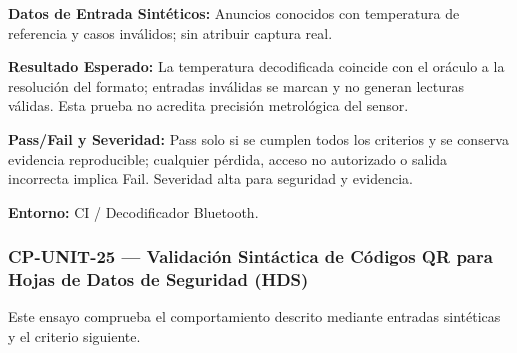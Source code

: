 \par\noindent\textbf{Datos de Entrada Sintéticos:} Anuncios conocidos con temperatura de referencia y casos inválidos; sin atribuir captura real.\par
\par\noindent\textbf{Resultado Esperado:} La temperatura decodificada coincide con el oráculo a la resolución del formato; entradas inválidas se marcan y no generan lecturas válidas. Esta prueba no acredita precisión metrológica del sensor.\par
\par\noindent\textbf{Pass/Fail y Severidad:} Pass solo si se cumplen todos los criterios y se conserva evidencia reproducible; cualquier pérdida, acceso no autorizado o salida incorrecta implica Fail. Severidad alta para seguridad y evidencia.\par
\par\noindent\textbf{Entorno:} CI / Decodificador Bluetooth.\par


\subsubsection*{CP-UNIT-25 — Validación Sintáctica de Códigos QR para Hojas de Datos de Seguridad (HDS)}\label{sec:9-cp-unit-25}
Este ensayo comprueba el comportamiento descrito mediante entradas sintéticas y el criterio siguiente.

